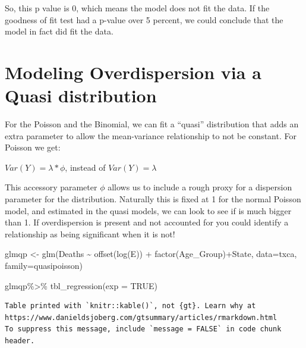 \documentclass[
  letterpaper,
  DIV=11,
  numbers=noendperiod]{scrreprt}
\newenvironment{Shaded}{\begin{snugshade}}{\end{snugshade}}
\newcommand{\AttributeTok}[1]{\textcolor[rgb]{0.40,0.45,0.13}{#1}}
\newcommand{\ConstantTok}[1]{\textcolor[rgb]{0.56,0.35,0.01}{#1}}
\newcommand{\FunctionTok}[1]{\textcolor[rgb]{0.28,0.35,0.67}{#1}}
\newcommand{\NormalTok}[1]{\textcolor[rgb]{0.00,0.23,0.31}{#1}}
\newcommand{\OtherTok}[1]{\textcolor[rgb]{0.00,0.23,0.31}{#1}}
\newcommand{\SpecialCharTok}[1]{\textcolor[rgb]{0.37,0.37,0.37}{#1}}
\begin{document}
So, this p value is 0, which means the model does not fit the data. If
the goodness of fit test had a p-value over 5 percent, we could conclude
that the model in fact did fit the data.

\hypertarget{modeling-overdispersion-via-a-quasi-distribution}{%
\section{Modeling Overdispersion via a Quasi
distribution}\label{modeling-overdispersion-via-a-quasi-distribution}}

For the Poisson and the Binomial, we can fit a ``quasi'' distribution
that adds an extra parameter to allow the mean-variance relationship to
not be constant. For Poisson we get:

\(Var(Y) = \lambda * \phi\), instead of \(Var(Y) = \lambda\)

This accessory parameter \(\phi\) allows us to include a rough proxy for
a dispersion parameter for the distribution. Naturally this is fixed at
1 for the normal Poisson model, and estimated in the quasi models, we
can look to see if is much bigger than 1. If overdispersion is present
and not accounted for you could identify a relationship as being
significant when it is not!

\begin{Shaded}
\begin{Highlighting}[]
\NormalTok{glmqp }\OtherTok{\textless{}{-}} \FunctionTok{glm}\NormalTok{(Deaths }\SpecialCharTok{\textasciitilde{}} \FunctionTok{offset}\NormalTok{(}\FunctionTok{log}\NormalTok{(E)) }\SpecialCharTok{+} \FunctionTok{factor}\NormalTok{(Age\_Group)}\SpecialCharTok{+}\NormalTok{State,}
              \AttributeTok{data=}\NormalTok{txca,}
              \AttributeTok{family=}\NormalTok{quasipoisson)}

\NormalTok{glmqp}\SpecialCharTok{\%\textgreater{}\%}
  \FunctionTok{tbl\_regression}\NormalTok{(}\AttributeTok{exp =} \ConstantTok{TRUE}\NormalTok{)}
\end{Highlighting}
\end{Shaded}

\begin{verbatim}
Table printed with `knitr::kable()`, not {gt}. Learn why at
https://www.danieldsjoberg.com/gtsummary/articles/rmarkdown.html
To suppress this message, include `message = FALSE` in code chunk header.
\end{verbatim}
\end{document}
